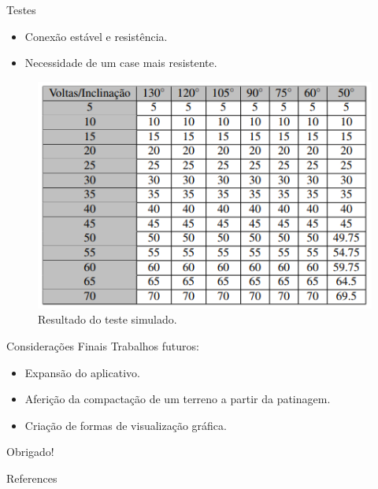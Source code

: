 \documentclass[12pt]{beamer}
\begin{document}
\begin{frame}{Testes}
    \begin{itemize}
        \item Conexão estável e resistência.
        \item Necessidade de um case mais resistente.
    \end{itemize}
        \begin{figure}[H]
        \centering
        \includegraphics[scale=.6]{tab.png}
        \caption{Resultado do teste simulado.}
        \label{fig:caseAtual}
    \end{figure}
\end{frame}

\begin{frame}{Considerações Finais}
    Trabalhos futuros:
    \begin{itemize}
        \item Expansão do aplicativo.
        \item Aferição da compactação de um terreno a partir da patinagem.
        \item Criação de formas de visualização gráfica.
    \end{itemize}
\end{frame}

\begin{frame}[standout]
  Obrigado!
\end{frame}

\begin{frame}[allowframebreaks]{References}

  
  

\end{frame}
\end{document}
